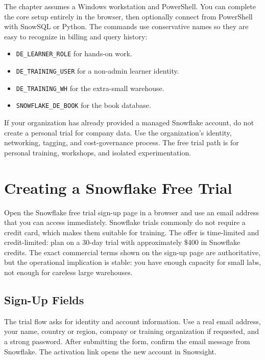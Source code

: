 The chapter assumes a Windows workstation and PowerShell. You can complete the core setup entirely in the browser, then optionally connect from PowerShell with SnowSQL or Python. The commands use conservative names so they are easy to recognize in billing and query history:
\begin{itemize}
    \item \texttt{DE\_LEARNER\_ROLE} for hands-on work.
    \item \texttt{DE\_TRAINING\_USER} for a non-admin learner identity.
    \item \texttt{DE\_TRAINING\_WH} for the extra-small warehouse.
    \item \texttt{SNOWFLAKE\_DE\_BOOK} for the book database.
\end{itemize}

\begin{notebox}
If your organization has already provided a managed Snowflake account, do not create a personal trial for company data. Use the organization's identity, networking, tagging, and cost-governance process. The free trial path is for personal training, workshops, and isolated experimentation.
\end{notebox}

\section{Creating a Snowflake Free Trial}
Open the Snowflake free trial sign-up page in a browser and use an email address that you can access immediately. Snowflake trials commonly do not require a credit card, which makes them suitable for training. The offer is time-limited and credit-limited: plan on a 30-day trial with approximately \$400 in Snowflake credits. The exact commercial terms shown on the sign-up page are authoritative, but the operational implication is stable: you have enough capacity for small labs, not enough for careless large warehouses.

\subsection{Sign-Up Fields}
The trial flow asks for identity and account information. Use a real email address, your name, country or region, company or training organization if requested, and a strong password. After submitting the form, confirm the email message from Snowflake. The activation link opens the new account in Snowsight.

